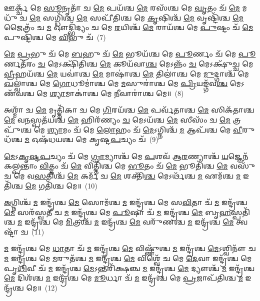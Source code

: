 {\anuvakamend[{𑌵𑌿𑌶𑍍𑌵𑌂᳴ \ul{𑌚} 𑌶𑌯᳴𑌨\-\ul{𑌮}\-𑌷𑍍𑌟𑍗 𑌚᳴}]}%

𑌊𑌰𑍍𑌕𑍍𑌚᳴ 𑌮𑍇 \ul{𑌸𑍂}\-𑌨𑍃𑌤𑌾᳴ 𑌚 \ul{𑌮𑍇} 𑌪𑌯᳴𑌶𑍍𑌚 \ul{𑌮𑍇} 𑌰𑌸᳴𑌶𑍍𑌚 𑌮𑍇 \ul{𑌘𑍃}\-𑌤𑌂 𑌚᳴ \ul{𑌮𑍇} 𑌮𑌧𑍁᳴ 𑌚 \ul{𑌮𑍇} 𑌸𑌗𑍍𑌧𑌿᳴𑌶𑍍𑌚 \ul{𑌮𑍇} 𑌸𑌪𑍀᳴𑌤𑌿𑌶𑍍𑌚 𑌮𑍇 \ul{𑌕𑍃}\-𑌷𑌿𑌶𑍍𑌚᳴ \ul{𑌮𑍇} 𑌵𑍃𑌷𑍍𑌟𑌿᳴𑌶𑍍𑌚 \ul{𑌮𑍇} 𑌜𑍈𑌤𑍍𑌰𑌂᳴ 𑌚 \ul{𑌮} 𑌔𑌦𑍍𑌭𑌿᳴𑌦𑍍𑌯𑌂 𑌚 𑌮𑍇 \ul{𑌰}\-𑌯𑌿𑌶𑍍𑌚᳴ \ul{𑌮𑍇} 𑌰𑌾𑌯᳴𑌶𑍍𑌚 𑌮𑍇 \ul{𑌪𑍁}\-𑌷𑍍𑌟𑌂 𑌚᳴ \ul{𑌮𑍇} 𑌪𑍁𑌷𑍍𑌟𑌿᳴𑌶𑍍𑌚 𑌮𑍇 \ul{𑌵𑌿}\-𑌭𑍁 𑌚᳴~(7)

\-\ul{𑌮𑍇} \ul{𑌪𑍍𑌰}\-𑌭𑍁 𑌚᳴ 𑌮𑍇 \ul{𑌬}\-𑌹𑍁 𑌚᳴ \ul{𑌮𑍇} 𑌭𑍂𑌯᳴𑌶𑍍𑌚 𑌮𑍇 \ul{𑌪𑍂}\-𑌰𑍍𑌣𑌂 𑌚᳴ 𑌮𑍇 \ul{𑌪𑍂}\-𑌰𑍍𑌣𑌤᳴𑌰𑌂 \ul{𑌚} 𑌮𑍇\-𑌽𑌕𑍍𑌷𑌿᳴𑌤𑌿𑌶𑍍𑌚 \ul{𑌮𑍇} 𑌕𑍂𑌯᳴𑌵𑌾\-\ul{𑌶𑍍𑌚} 𑌮𑍇\-𑌽𑌨𑍍𑌨𑌂᳴ \ul{𑌚} 𑌮𑍇\-𑌽𑌕𑍍𑌷𑍁᳴𑌚𑍍𑌚 𑌮𑍇 \ul{𑌵𑍍𑌰𑍀}\-𑌹𑌯᳴𑌶𑍍𑌚 \ul{𑌮𑍇} 𑌯𑌵𑌾॑𑌶𑍍𑌚 \ul{𑌮𑍇} 𑌮𑌾𑌷𑌾॑𑌶𑍍𑌚 \ul{𑌮𑍇} 𑌤𑌿𑌲𑌾॑𑌶𑍍𑌚 𑌮𑍇 \ul{𑌮𑍁}\-𑌦𑍍𑌗𑌾𑌶𑍍𑌚᳴ 𑌮𑍇 \ul{𑌖}\-𑌲𑍍𑌵𑌾॑𑌶𑍍𑌚 𑌮𑍇 \ul{𑌗𑍋}\-𑌧𑍂𑌮𑌾॑𑌶𑍍𑌚 𑌮𑍇 \ul{𑌮}\-𑌸𑍁𑌰𑌾॑𑌶𑍍𑌚 𑌮𑍇 \ul{𑌪𑍍𑌰𑌿}\-𑌯𑌙𑍍𑌗᳴𑌵\-\ul{𑌶𑍍𑌚} 𑌮𑍇\-𑌽𑌣᳴𑌵𑌶𑍍𑌚 𑌮𑍇 \ul{𑌶𑍍𑌯𑌾}\-𑌮𑌾𑌕𑌾॑𑌶𑍍𑌚 𑌮𑍇 \ul{𑌨𑍀}\-𑌵𑌾𑌰𑌾॑𑌶𑍍𑌚 𑌮𑍇॥~(8)

{\anuvakamend[{\-\ul{𑌵𑌿}\-𑌭𑍁 𑌚᳴ \ul{𑌮}\-𑌸𑍁\-\ul{𑌰𑌾}\-𑌶𑍍𑌚𑌤𑍁᳴𑌰𑍍𑌦𑌶 𑌚}]}%

𑌅𑌶𑍍𑌮𑌾᳴ 𑌚 \ul{𑌮𑍇} 𑌮𑍃𑌤𑍍𑌤𑌿᳴𑌕𑌾 𑌚 𑌮𑍇 \ul{𑌗𑌿}\-𑌰𑌯᳴𑌶𑍍𑌚 \ul{𑌮𑍇} 𑌪𑌰𑍍𑌵᳴𑌤𑌾𑌶𑍍𑌚 \ul{𑌮𑍇} 𑌸𑌿𑌕᳴𑌤𑌾𑌶𑍍𑌚 \ul{𑌮𑍇} 𑌵\-\ul{𑌨}\-𑌸𑍍𑌪𑌤᳴𑌯𑌶𑍍𑌚 \ul{𑌮𑍇} 𑌹𑌿𑌰᳴𑌣𑍍𑌯𑌂 \ul{𑌚} 𑌮𑍇\-𑌽𑌯᳴𑌶𑍍𑌚 \ul{𑌮𑍇} 𑌸𑍀𑌸𑌂᳴ 𑌚 \ul{𑌮𑍇} 𑌤𑍍𑌰𑌪𑍁᳴𑌶𑍍𑌚 𑌮𑍇 \ul{𑌶𑍍𑌯𑌾}\-𑌮𑌂 𑌚᳴ 𑌮𑍇 \ul{𑌲𑍋}\-𑌹𑌂 𑌚᳴ \ul{𑌮𑍇}\-\-𑌽𑌗𑍍𑌨𑌿𑌶𑍍𑌚᳴ \ul{𑌮} 𑌆𑌪᳴𑌶𑍍𑌚 𑌮𑍇 \ul{𑌵𑍀}\-𑌰𑍁𑌧᳴𑌶𑍍𑌚 \ul{𑌮} 𑌓𑌷᳴𑌧𑌯𑌶𑍍𑌚 𑌮𑍇 𑌕𑍃𑌷𑍍𑌟\-\ul{𑌪}\-𑌚𑍍𑌯𑌂 𑌚᳴~(9)

\-\ul{𑌮𑍇}\-\-𑌽\-\ul{𑌕𑍃}\-\-\ul{𑌷𑍍𑌟}\-\-\ul{𑌪}\-𑌚𑍍𑌯𑌂 𑌚᳴ 𑌮𑍇 \ul{𑌗𑍍𑌰𑌾}\-𑌮𑍍𑌯𑌾𑌶𑍍𑌚᳴ 𑌮𑍇 \ul{𑌪}\-𑌶𑌵᳴ 𑌆\-\ul{𑌰}\-𑌣𑍍𑌯𑌾𑌶𑍍𑌚᳴ \ul{𑌯}\-𑌜𑍍𑌞𑍇𑌨᳴ 𑌕𑌲𑍍𑌪𑌨𑍍𑌤𑌾𑌂 \ul{𑌵𑌿}\-𑌤𑍍𑌤𑌂 𑌚᳴ \ul{𑌮𑍇} 𑌵𑌿𑌤𑍍𑌤𑌿᳴𑌶𑍍𑌚 𑌮𑍇 \ul{𑌭𑍂}\-𑌤𑌂 𑌚᳴ \ul{𑌮𑍇} 𑌭𑍂𑌤𑌿᳴𑌶𑍍𑌚 \ul{𑌮𑍇} 𑌵𑌸𑍁᳴ 𑌚 𑌮𑍇 𑌵\-\ul{𑌸}\-𑌤𑌿𑌶𑍍𑌚᳴ \ul{𑌮𑍇} 𑌕𑌰𑍍𑌮᳴ 𑌚 \ul{𑌮𑍇} 𑌶𑌕𑍍𑌤𑌿᳴\-\ul{𑌶𑍍𑌚} 𑌮𑍇\-𑌽𑌰𑍍𑌥᳴𑌶𑍍𑌚 \ul{𑌮} 𑌏𑌮᳴𑌶𑍍𑌚 \ul{𑌮} 𑌇𑌤𑌿᳴𑌶𑍍𑌚 \ul{𑌮𑍇} 𑌗𑌤𑌿᳴𑌶𑍍𑌚 𑌮𑍇॥~(10)

{\anuvakamend[{\-\ul{𑌕𑍃}\-\-\ul{𑌷𑍍𑌟}\-\-\ul{𑌪}\-𑌚𑍍𑌯\-\ul{𑌞𑍍𑌚𑌾}\-𑌷𑍍𑌟𑌾𑌚᳴𑌤𑍍𑌵𑌾𑌰𑌿𑍞𑌶𑌚𑍍𑌚}]}%

\-\ul{𑌅}\-𑌗𑍍𑌨𑌿𑌶𑍍𑌚᳴ \ul{𑌮} 𑌇𑌨𑍍𑌦𑍍𑌰᳴𑌶𑍍𑌚 \ul{𑌮𑍇} 𑌸𑍋𑌮᳴𑌶𑍍𑌚 \ul{𑌮} 𑌇𑌨𑍍𑌦𑍍𑌰᳴𑌶𑍍𑌚 𑌮𑍇 𑌸\-\ul{𑌵𑌿}\-𑌤𑌾 𑌚᳴ \ul{𑌮} 𑌇𑌨𑍍𑌦𑍍𑌰᳴𑌶𑍍𑌚 \ul{𑌮𑍇} 𑌸𑌰᳴𑌸𑍍𑌵𑌤𑍀 𑌚 \ul{𑌮} 𑌇𑌨𑍍𑌦𑍍𑌰᳴𑌶𑍍𑌚 𑌮𑍇 \ul{𑌪𑍂}\-𑌷𑌾 𑌚᳴ \ul{𑌮} 𑌇𑌨𑍍𑌦𑍍𑌰᳴𑌶𑍍𑌚 \ul{𑌮𑍇} 𑌬𑍃\-\ul{𑌹}\-𑌸𑍍𑌪𑌤𑌿᳴𑌶𑍍𑌚 \ul{𑌮} 𑌇𑌨𑍍𑌦𑍍𑌰᳴𑌶𑍍𑌚 𑌮𑍇 \ul{𑌮𑌿}\-𑌤𑍍𑌰𑌶𑍍𑌚᳴ \ul{𑌮} 𑌇𑌨𑍍𑌦𑍍𑌰᳴𑌶𑍍𑌚 \ul{𑌮𑍇} 𑌵𑌰𑍁᳴𑌣𑌶𑍍𑌚 \ul{𑌮} 𑌇𑌨𑍍𑌦𑍍𑌰᳴𑌶𑍍𑌚 \ul{𑌮𑍇} 𑌤𑍍𑌵𑌷𑍍𑌟𑌾᳴ 𑌚~(11)

\-\ul{𑌮} 𑌇𑌨𑍍𑌦𑍍𑌰᳴𑌶𑍍𑌚 𑌮𑍇 \ul{𑌧𑌾}\-𑌤𑌾 𑌚᳴ \ul{𑌮} 𑌇𑌨𑍍𑌦𑍍𑌰᳴𑌶𑍍𑌚 \ul{𑌮𑍇} 𑌵𑌿𑌷𑍍𑌣𑍁᳴𑌶𑍍𑌚 \ul{𑌮} 𑌇𑌨𑍍𑌦𑍍𑌰᳴𑌶𑍍𑌚 \ul{𑌮𑍇}\-\-𑌽𑌶𑍍𑌵𑌿𑌨𑍗᳴ 𑌚 \ul{𑌮} 𑌇𑌨𑍍𑌦𑍍𑌰᳴𑌶𑍍𑌚 𑌮𑍇 \ul{𑌮}\-𑌰𑍁𑌤᳴𑌶𑍍𑌚 \ul{𑌮} 𑌇𑌨𑍍𑌦𑍍𑌰᳴𑌶𑍍𑌚 \ul{𑌮𑍇} 𑌵𑌿𑌶𑍍𑌵𑍇᳴ 𑌚 𑌮𑍇 \ul{𑌦𑍇}\-𑌵𑌾 𑌇𑌨𑍍𑌦𑍍𑌰᳴𑌶𑍍𑌚 𑌮𑍇 𑌪𑍃\-\ul{𑌥𑌿}\-𑌵𑍀 𑌚᳴ \ul{𑌮} 𑌇𑌨𑍍𑌦𑍍𑌰᳴𑌶𑍍𑌚 \ul{𑌮𑍇}\-\-𑌽𑌨𑍍𑌤𑌰𑌿᳴𑌕𑍍𑌷𑌞𑍍𑌚 \ul{𑌮} 𑌇𑌨𑍍𑌦𑍍𑌰᳴𑌶𑍍𑌚 \ul{𑌮𑍇} 𑌦𑍍𑌯𑍗𑌶𑍍𑌚᳴ \ul{𑌮} 𑌇𑌨𑍍𑌦𑍍𑌰᳴𑌶𑍍𑌚 \ul{𑌮𑍇} 𑌦𑌿𑌶᳴𑌶𑍍𑌚 \ul{𑌮} 𑌇𑌨𑍍𑌦𑍍𑌰᳴𑌶𑍍𑌚 𑌮𑍇 \ul{𑌮𑍂}\-𑌰𑍍𑌧𑌾 𑌚᳴ \ul{𑌮} 𑌇𑌨𑍍𑌦𑍍𑌰᳴𑌶𑍍𑌚 𑌮𑍇 \ul{𑌪𑍍𑌰}\-𑌜𑌾𑌪᳴𑌤𑌿𑌶𑍍𑌚 \ul{𑌮} 𑌇𑌨𑍍𑌦𑍍𑌰᳴𑌶𑍍𑌚 𑌮𑍇॥~(12)

